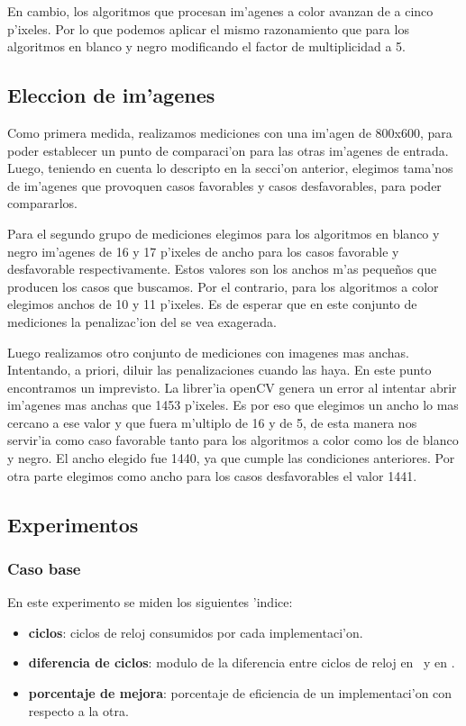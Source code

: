 En cambio, los algoritmos que procesan im'agenes a color avanzan de a cinco p'ixeles. Por lo que podemos aplicar el mismo razonamiento que para los algoritmos en blanco y negro modificando el factor de multiplicidad a 5.

\subsection{Eleccion de im'agenes}
Como primera medida, realizamos mediciones con una im'agen de 800x600, para poder establecer un punto de comparaci'on para las otras im'agenes de entrada. Luego, teniendo en cuenta lo descripto en la secci'on anterior, elegimos tama'nos de im'agenes que provoquen casos favorables y casos desfavorables, para poder compararlos. 

Para el segundo grupo de mediciones elegimos para los algoritmos en blanco y negro im'agenes de 16 y 17 p'ixeles de ancho para los casos favorable y desfavorable respectivamente. Estos valores son los anchos m'as pequeños que producen los casos que buscamos. Por el contrario, para los algoritmos a color elegimos anchos de 10 y 11 p'ixeles. Es de esperar que en este conjunto de mediciones la penalizac'ion del \ass se vea exagerada.

Luego realizamos otro conjunto de mediciones con imagenes mas anchas. Intentando, a priori, diluir las penalizaciones cuando las haya. En este punto encontramos un imprevisto. La librer'ia openCV genera un error al intentar abrir im'agenes mas anchas que 1453 p'ixeles. Es por eso que elegimos un ancho lo mas cercano a ese valor y que fuera m'ultiplo de 16 y de 5, de esta manera nos servir'ia como caso favorable tanto para los algoritmos a color como los de blanco y negro. El ancho elegido fue 1440, ya que cumple las condiciones anteriores. Por otra parte elegimos como ancho para los casos desfavorables el valor 1441.


\subsection{Experimentos}
\subsubsection{Caso base}
En este experimento se miden los siguientes 'indice:
\begin{itemize}
 \item{} \textbf{ciclos}: ciclos de reloj consumidos por cada implementaci'on.
 \item{} \textbf{diferencia de ciclos}: modulo de la diferencia entre ciclos de reloj en \C \ y en \ass.
 \item{} \textbf{porcentaje de mejora}: porcentaje de eficiencia de un implementaci'on con respecto a la otra.
\end{itemize}


